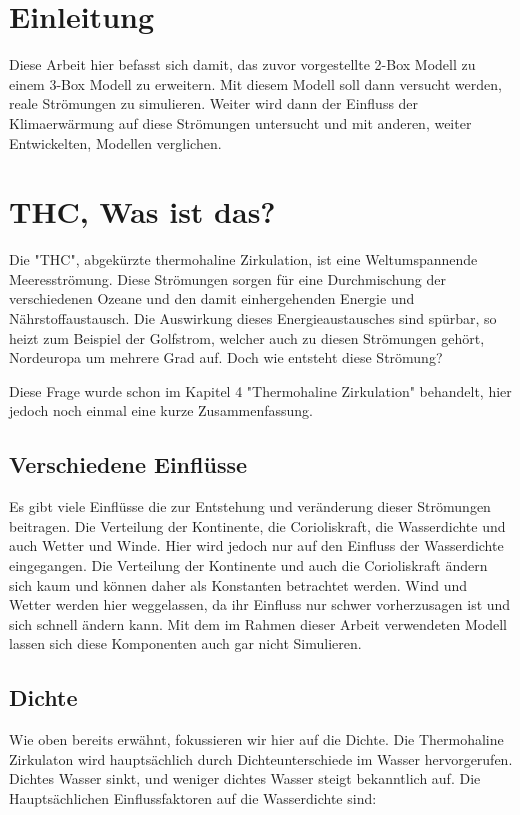 \section{Einleitung}

Diese Arbeit hier befasst sich damit, das zuvor vorgestellte 2-Box Modell zu einem 3-Box Modell zu erweitern. Mit diesem Modell soll dann versucht werden, reale Strömungen zu simulieren. Weiter wird dann der Einfluss der Klimaerwärmung auf diese Strömungen untersucht und mit anderen, weiter Entwickelten, Modellen verglichen.


\section{THC, Was ist das?}

Die "THC", abgekürzte thermohaline Zirkulation, ist eine Weltumspannende Meeresströmung.
Diese Strömungen sorgen für eine Durchmischung der verschiedenen Ozeane und den damit einhergehenden Energie und Nährstoffaustausch. 
Die Auswirkung dieses Energieaustausches sind spürbar, so heizt zum Beispiel der Golfstrom, welcher auch zu diesen Strömungen gehört, Nordeuropa um mehrere Grad auf.
Doch wie entsteht diese Strömung? 

Diese Frage wurde schon im Kapitel 4 "Thermohaline Zirkulation" behandelt, hier jedoch noch einmal eine kurze Zusammenfassung.



\subsection{Verschiedene Einflüsse}
Es gibt viele Einflüsse die zur Entstehung und veränderung dieser Strömungen beitragen. Die Verteilung der Kontinente, die Corioliskraft, die Wasserdichte und auch Wetter und Winde. Hier wird jedoch nur auf den Einfluss der Wasserdichte eingegangen.
Die Verteilung der Kontinente und auch die Corioliskraft ändern sich kaum und können daher als Konstanten betrachtet werden. Wind und Wetter werden hier weggelassen, da ihr Einfluss nur schwer vorherzusagen ist und sich schnell ändern kann. Mit dem im Rahmen dieser Arbeit verwendeten Modell lassen sich diese Komponenten auch gar nicht Simulieren.

\subsection{Dichte}
Wie oben bereits erwähnt, fokussieren wir hier auf die Dichte.
Die Thermohaline Zirkulaton wird hauptsächlich durch Dichteunterschiede im Wasser hervorgerufen.
Dichtes Wasser sinkt, und weniger dichtes Wasser steigt bekanntlich auf. Die Hauptsächlichen Einflussfaktoren auf die Wasserdichte sind:

